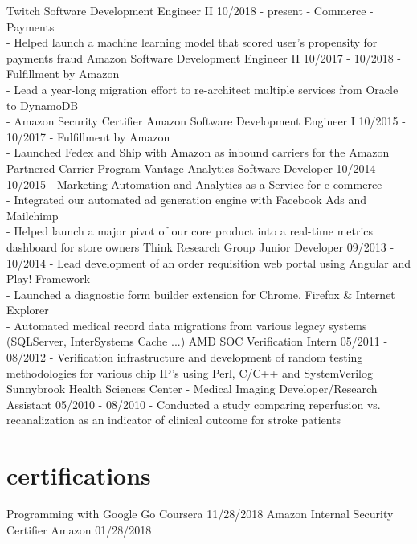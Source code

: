 \documentclass[]{friggeri-cv}
\begin{document}
\begin{entrylist}
  \entry
    {Twitch}
    {Software Development Engineer II}
    {10/2018 - present}
    {- Commerce - Payments\\
     - Helped launch a machine learning model that scored user's propensity for payments fraud}
  \entry
    {Amazon}
    {Software Development Engineer II}
    {10/2017 - 10/2018}
    {- Fulfillment by Amazon\\
     - Lead a year-long migration effort to re-architect multiple services from Oracle to DynamoDB\\
     - Amazon Security Certifier}
  \entry
    {Amazon}
    {Software Development Engineer I}
    {10/2015 - 10/2017}
    {- Fulfillment by Amazon\\
     - Launched Fedex and Ship with Amazon as inbound carriers for the Amazon Partnered Carrier Program}
  \entry
    {Vantage Analytics}
    {Software Developer}
    {10/2014 - 10/2015}
    {- Marketing Automation and Analytics as a Service for e-commerce\\
     - Integrated our automated ad generation engine with Facebook Ads and Mailchimp\\
     - Helped launch a major pivot of our core product into a real-time metrics dashboard for store owners}
  \entry
    {Think Research Group}
    {Junior Developer}
    {09/2013 - 10/2014}
    {- Lead development of an order requisition web portal using Angular and Play! Framework\\
     - Launched a diagnostic form builder extension for Chrome, Firefox \& Internet Explorer\\
     - Automated medical record data migrations from various legacy systems (SQLServer, InterSystems
 Cache ...)}
  \entry
    {AMD}
    {SOC Verification Intern}
    {05/2011 - 08/2012}
    {- Verification infrastructure and development of random testing
    methodologies for various chip IP’s using Perl, C/C++ and SystemVerilog}
  \entry
    {Sunnybrook Health Sciences Center - Medical Imaging}
    {Developer/Research Assistant}
    {05/2010 - 08/2010}
    {- Conducted a study comparing reperfusion vs. recanalization as an indicator of clinical outcome for stroke patients}
\end{entrylist}

\section{certifications}

\begin{entrylist}
  \entry
    {Programming with Google Go}
    {Coursera}
    {11/28/2018}
    {}
  \entry
    {Amazon Internal Security Certifier}
    {Amazon}
    {01/28/2018}
    {}
\end{entrylist}
\end{document}

